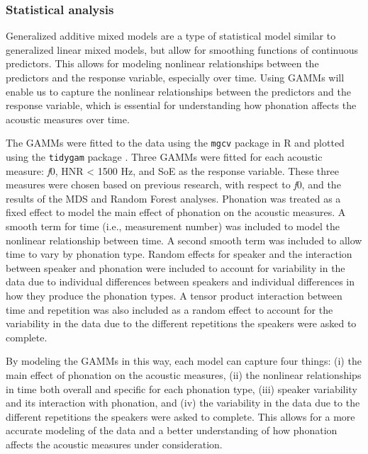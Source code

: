 \subsubsection{Statistical analysis} \label{sec:statistical_analysis}

Generalized additive mixed models \citep[GAMM;][]{hastieGeneralizedAdditiveModels1986,woodGeneralizedAdditiveModels2017} are a type of statistical model similar to generalized linear mixed models, but allow for smoothing functions of continuous predictors. This allows for modeling nonlinear relationships between the predictors and the response variable, especially over time. Using GAMMs will enable us to capture the nonlinear relationships between the predictors and the response variable, which is essential for understanding how phonation affects the acoustic measures over time. 

The GAMMs were fitted to the data using the \texttt{mgcv} package in R \citep{woodGeneralizedAdditiveModels2017} and plotted using the \texttt{tidygam} package \citep{corettaTidygamTidyPrediction2024}. Three GAMMs were fitted for each acoustic measure: \textit{f}0, HNR < 1500 Hz, and SoE as the response variable. These three measures were chosen based on previous research, with respect to \textit{f}0, and the results of the MDS and Random Forest analyses. Phonation was treated as a fixed effect to model the main effect of phonation on the acoustic measures. A smooth term for time (i.e., measurement number)  was included to model the nonlinear relationship between time. A second smooth term was included to allow time to vary by phonation type. Random effects for speaker and the interaction between speaker and phonation were included to account for variability in the data due to individual differences between speakers and individual differences in how they produce the phonation types. A tensor product interaction between time and repetition was also included as a random effect to account for the variability in the data due to the different repetitions the speakers were asked to complete. 

By modeling the GAMMs in this way, each model can capture four things: (i) the main effect of phonation on the acoustic measures, (ii) the nonlinear relationships in time both overall and specific for each phonation type, (iii) speaker variability and its interaction with phonation, and (iv) the variability in the data due to the different repetitions the speakers were asked to complete. This allows for a more accurate modeling of the data and a better understanding of how phonation affects the acoustic measures under consideration. 

